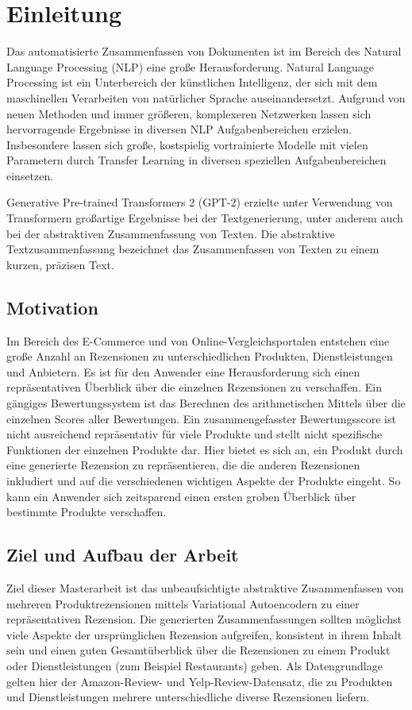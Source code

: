 \section{Einleitung}\raggedbottom
Das automatisierte Zusammenfassen von Dokumenten ist im Bereich des Natural Language Processing (NLP) eine große Herausforderung.
Natural Language Processing ist ein Unterbereich der künstlichen Intelligenz, der sich mit dem maschinellen Verarbeiten von natürlicher Sprache auseinandersetzt. 
Aufgrund von neuen Methoden und immer größeren, komplexeren Netzwerken lassen sich hervorragende Ergebnisse in diversen NLP Aufgabenbereichen erzielen. 
Insbesondere lassen sich große, kostspielig vortrainierte Modelle mit vielen Parametern durch Transfer Learning in diversen speziellen Aufgabenbereichen einsetzen. 

Generative Pre-trained Transformers 2 (GPT-2) erzielte unter Verwendung von Transformern großartige Ergebnisse bei der Textgenerierung, unter anderem auch bei der abstraktiven Zusammenfassung von Texten. 
Die abstraktive Textzusammenfassung bezeichnet das Zusammenfassen von Texten zu einem kurzen, präzisen Text. 

\subsection{Motivation}
Im Bereich des E-Commerce und von Online-Vergleichsportalen entstehen eine große Anzahl an Rezensionen zu unterschiedlichen Produkten, Dienstleistungen und Anbietern.
Es ist für den Anwender eine Herausforderung sich einen repräsentativen Überblick über die einzelnen Rezensionen zu verschaffen. 
Ein gängiges Bewertungssystem ist das Berechnen des arithmetischen Mittels über die einzelnen Scores aller Bewertungen. 
Ein zusammengefasster Bewertungsscore ist nicht ausreichend repräsentativ für viele Produkte und stellt nicht spezifische Funktionen der einzelnen Produkte dar.
Hier bietet es sich an, ein Produkt durch eine generierte Rezension zu repräsentieren, die die anderen Rezensionen inkludiert und auf die verschiedenen wichtigen Aspekte der Produkte eingeht.
So kann ein Anwender sich zeitsparend einen ersten groben Überblick über bestimmte Produkte verschaffen.

\subsection{Ziel und Aufbau der Arbeit}
Ziel dieser Masterarbeit ist das unbeaufsichtigte abstraktive Zusammenfassen von mehreren Produktrezensionen mittels Variational Autoencodern zu einer repräsentativen Rezension.
Die generierten Zusammenfassungen sollten möglichst viele Aspekte der ursprünglichen Rezension aufgreifen, konsistent in ihrem Inhalt sein und einen guten Gesamtüberblick über die Rezensionen zu einem Produkt oder Dienstleistungen (zum Beispiel Restaurants) geben.
Als Datengrundlage gelten hier der Amazon-Review- und Yelp-Review-Datensatz, die zu Produkten und Dienstleistungen mehrere unterschiedliche diverse Rezensionen liefern.

